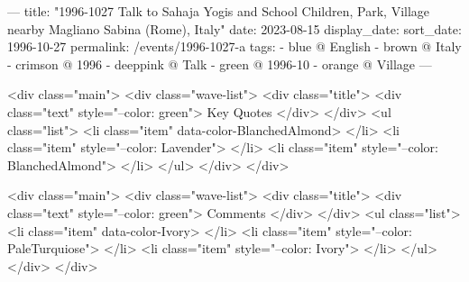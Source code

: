 ---
title: "1996-1027 Talk to Sahaja Yogis and School Children, Park, Village nearby Magliano Sabina (Rome), Italy"
date: 2023-08-15
display_date: 
sort_date: 1996-10-27
permalink: /events/1996-1027-a
tags:
  - blue @ English
  - brown @ Italy
  - crimson @ 1996
  - deeppink @ Talk
  - green @ 1996-10
  - orange @ Village
---

<div class="main">
  <div class="wave-list">
    <div class="title">
      <div class="text" style="--color: green">
        Key Quotes
      </div>
    </div>
    <ul class="list">
        <li class="item" data-color-BlanchedAlmond>
        </li>
        <li class="item" style="--color: Lavender">
        </li>
        <li class="item" style="--color: BlanchedAlmond">
        </li>
      </ul>
  </div>
</div>

<div class="main">
  <div class="wave-list">
    <div class="title">
      <div class="text" style="--color: green">
        Comments
      </div>
    </div>
    <ul class="list">
        <li class="item" data-color-Ivory>
        </li>
        <li class="item" style="--color: PaleTurquiose">
        </li>
        <li class="item" style="--color: Ivory">
        </li>
      </ul>
  </div>
</div>